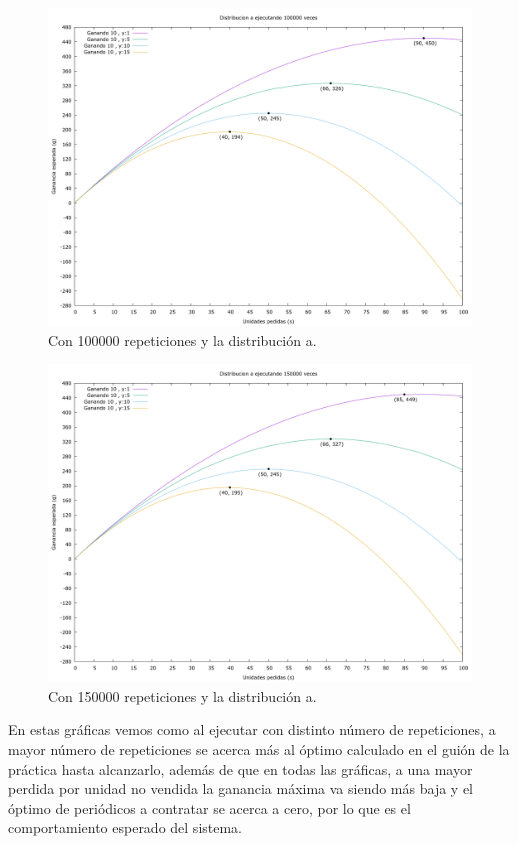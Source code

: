 \documentclass[12pt, spanish]{article}
\begin{document}
\begin{figure}[H]
	\centering
	\includegraphics[scale = 0.2]{prob_a/datos_a_100000.png}
	\caption{Con 100000 repeticiones y la distribución a.}
	\label{fig:ej1_a_100000}

\end{figure}

\begin{figure}[H]
	\centering
	\includegraphics[scale = 0.2]{prob_a/datos_a_150000.png}
	\caption{Con 150000 repeticiones y la distribución a.}
	\label{fig:ej1_a_150000}

\end{figure}

En estas gráficas vemos como al ejecutar con distinto número de repeticiones, a mayor número de repeticiones se acerca más al óptimo calculado en el guión de la práctica hasta alcanzarlo, además de que en todas las gráficas, a una mayor perdida por unidad no vendida la ganancia máxima va siendo más baja y el óptimo de periódicos a contratar se acerca a cero, por lo que es el comportamiento esperado del sistema.
\end{document}
